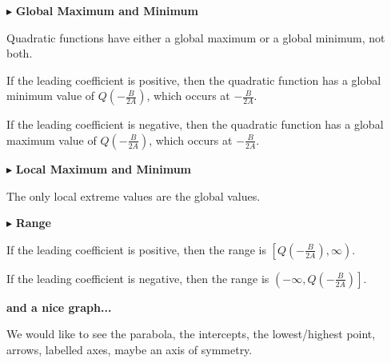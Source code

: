 \documentclass{ximera}
\begin{document}
$\blacktriangleright$  \textbf{\textcolor{red!10!blue!90!}{Global Maximum and Minimum}} 

Quadratic functions have either a global maximum or a global minimum, not both.





If the leading coefficient is positive, then the quadratic function has a global minimum value of $Q\left( -\frac{B}{2A} \right)$, which occurs at $-\frac{B}{2A}$. 




If the leading coefficient is negative, then the quadratic function has a global maximum value of $Q\left( -\frac{B}{2A} \right)$, which occurs at $-\frac{B}{2A}$. 








$\blacktriangleright$  \textbf{\textcolor{red!10!blue!90!}{Local Maximum and Minimum}} 

 The only local extreme values are the global values.




$\blacktriangleright$ \textbf{\textcolor{red!10!blue!90!}{Range}} 

If the leading coefficient is positive, then the range is $\left[ Q\left( -\frac{B}{2A} \right), \infty \right)$. 


If the leading coefficient is negative, then the range is $\left(-\infty, Q\left( -\frac{B}{2A} \right) \right]$. 












\textbf{\textcolor{purple!85!blue}{and a nice graph...}} 


We would like to see the parabola, the intercepts, the lowest/highest point, arrows, labelled axes, maybe an axis of symmetry.
\end{document}

